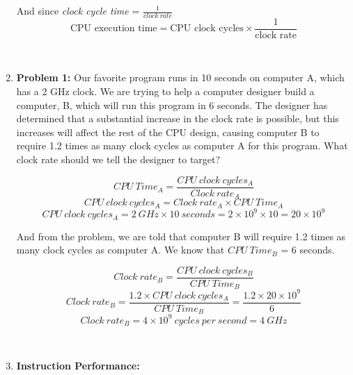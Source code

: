 \documentclass[12pt]{article}
\begin{document}
\begin{enumerate}
    And since \textit{clock cycle time} = $\frac{1}{clock\ rate}$
    \begin{equation}
        \text{CPU execution time} = \text{CPU clock cycles} \times \frac{1}{\text{clock rate}}
    \end{equation}
    
    \
    
    \item \textbf{Problem 1:} Our favorite program runs in 10 seconds on computer A, which has a 2 GHz clock. We are trying to help a computer designer build a computer, B, which will run this program in 6 seconds. The designer has determined that a substantial increase in the clock rate is possible, but this increases will affect the rest of the CPU design, causing computer B to require 1.2 times as many clock cycles as computer A for this program. What clock rate should we tell the designer to target?
        
    \begin{equation*}
        CPU\ Time_{A} = \frac{CPU\ clock\ cycles_{A}}{Clock\ rate_{A}}
    \end{equation*}
    \begin{equation*}
        CPU\ clock\ cycles_{A} = Clock\ rate_{A} \times CPU\ Time_{A}
    \end{equation*}
    \begin{equation*}
        CPU\ clock\ cycles_{A} = 2\ GHz \times 10\ seconds = 2 \times 10^{9} \times 10 = 20 \times 10^{9}
    \end{equation*}
    
    And from the problem, we are told that computer B will require 1.2 times as many clock cycles as computer A. We know that $CPU\ Time_{B}$ = 6 seconds.
    
    \begin{equation*}
        Clock\ rate_{B} = \frac{CPU\ clock\ cycles_{B}}{CPU\ Time_{B}}
    \end{equation*}  
    \begin{equation*}
        Clock\ rate_{B} = \frac{1.2 \times CPU\ clock\ cycles_{A}}{CPU\ Time_{B}} = \frac{1.2 \times 20 \times 10^{9}}{6}
    \end{equation*}  
    \begin{equation*}
        Clock\ rate_{B} = 4 \times 10^{9}\ cycles\ per\ second = 4\ GHz
    \end{equation*}  
    
    \ 
    
    \item \textbf{Instruction Performance:}
    

\end{enumerate}
\end{document}
